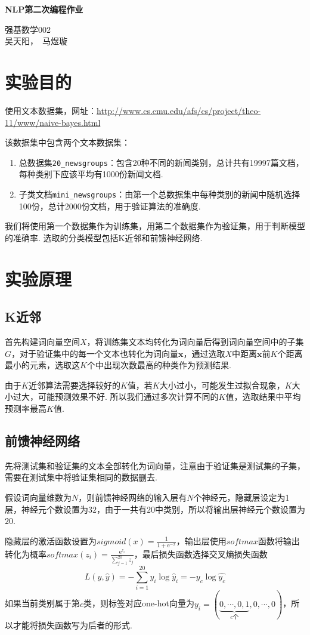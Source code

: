 \documentclass[12pt, a4paper, oneside]{ctexart}
\numberwithin{equation}{section}  %
\newenvironment{myTitle}[1]{
    \begin{center}
    {\zihao{-2}\bf #1\\}
    \zihao{-4}\it
}{\end{center}}  %
\def\bd{\boldsymbol}        %
\def\e{\mathrm{e}}          %
\def\add{\vspace{1ex}}      %
\begin{document}
\begin{myTitle}{NLP第二次编程作业}
    强基数学002\\
    吴天阳，\ 马煜璇
\end{myTitle}
\section{实验目的}

使用文本数据集，网址：\url{http://www.cs.cmu.edu/afs/cs/project/theo-11/www/naive-bayes.html}

该数据集中包含两个文本数据集：

\begin{enumerate}
\item
  总数据集\texttt{20\_newsgroups}：包含20种不同的新闻类别，总计共有19997篇文档，每种类别下应该平均有1000份新闻文档.
\item
  子类文档\texttt{mini\_newsgroups}：由第一个总数据集中每种类别的新闻中随机选择100份，总计2000份文档，用于验证算法的准确度.
\end{enumerate}

我们将使用第一个数据集作为训练集，用第二个数据集作为验证集，用于判断模型的准确率. 选取的分类模型包括K近邻和前馈神经网络.
\section{实验原理}
\subsection{K近邻}
首先构建词向量空间$X$，将训练集文本均转化为词向量后得到词向量空间中的子集$G$，对于验证集中的每一个文本也转化为词向量$\bd{x}$，通过选取$X$中距离$\bd{x}$前$K$个距离最小的元素，选取这$K$个中出现次数最高的种类作为预测结果.

由于$K$近邻算法需要选择较好的$K$值，若$K$大小过小，可能发生过拟合现象，$K$大小过大，可能预测效果不好. 所以我们通过多次计算不同的$K$值，选取结果中平均预测率最高$K$值.
\subsection{前馈神经网络}
先将测试集和验证集的文本全部转化为词向量，注意由于验证集是测试集的子集，需要在测试集中将验证集相同的数据删去.

假设词向量维数为$N$，则前馈神经网络的输入层有$N$个神经元，隐藏层设定为1层，神经元个数设置为$32$，由于一共有$20$中类别，所以将输出层神经元个数设置为$20$.\add

隐藏层的激活函数设置为$sigmoid(x) = \frac{1}{1+\e^{-x}}$，输出层使用$softmax$函数将输出转化为概率$softmax(z_i) = \frac{\e^{z_i}}{\sum_{j=1}^{20}z_j}$，最后损失函数选择交叉熵损失函数
\begin{equation*}
    L(y,\hat{y}) = -\sum_{i=1}^{20}y_i\log\hat{y}_i = -y_c\log \hat{y_c}
\end{equation*}
如果当前类别属于第$c$类，则标签对应one-hot向量为$y_i = (\underbrace{0,\cdots, 0, 1}_{c\text{个}},0,\cdots, 0)$，所以才能将损失函数写为后者的形式.
\end{document}
